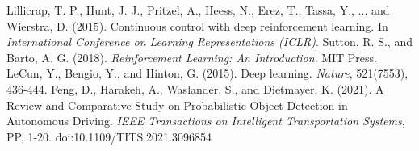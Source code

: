 \documentclass[conference]{IEEEtran}
\begin{document}
\begin{thebibliography}{00}
\bibitem Lillicrap, T. P., Hunt, J. J., Pritzel, A., Heess, N., Erez, T., Tassa, Y., ... and Wierstra, D. (2015). Continuous control with deep reinforcement learning. In \textit{International Conference on Learning Representations (ICLR)}.
\bibitem Sutton, R. S., and Barto, A. G. (2018). \textit{Reinforcement Learning: An Introduction}. MIT Press.
\bibitem LeCun, Y., Bengio, Y., and Hinton, G. (2015). Deep learning. \textit{Nature}, 521(7553), 436-444.
\bibitem Feng, D., Harakeh, A., Waslander, S., and Dietmayer, K. (2021). A Review and Comparative Study on Probabilistic Object Detection in Autonomous Driving. \textit{IEEE Transactions on Intelligent Transportation Systems}, PP, 1-20. doi:10.1109/TITS.2021.3096854

\end{thebibliography}
\vspace{12pt}
\end{document}
